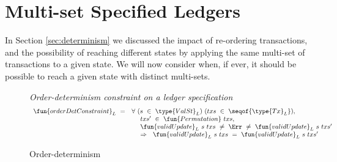 \section{Multi-set Specified Ledgers}
\label{sec:multiset}

In Section \ref{sec:determinism} we discussed the impact of re-ordering transactions,
and the possibility of reaching different states by applying the same multi-set
of transactions to a given state. We will now consider when, if ever, it should
be possible to reach a given state with distinct multi-sets.

\begin{figure*}[htb]
  \emph{Order-determinism constraint on a ledger specification}
  \begin{equation*}
    \begin{array}{l@{~~}l@{~~}ll}
    \fun{orderDetConstraint}_L ~=~ & \forall~(s~\in~\type{ValSt}_L)~(txs~\in~\seqof{\type{Tx}_L}),~\\
    & ~~~~txs'~\in~\fun{Permutation}~txs,~\\
    & ~~~~\fun{validUpdate}_L~s~txs~\neq~\Err~\neq~\fun{validUpdate}_L~s~txs' \\
    & ~~~~\Rightarrow~~\fun{validUpdate}_L~s~txs~=~\fun{validUpdate}_L~s~txs'
    \end{array}
  \end{equation*}
  \caption{Order-determinism}
  \label{fig:order-det}
\end{figure*}
